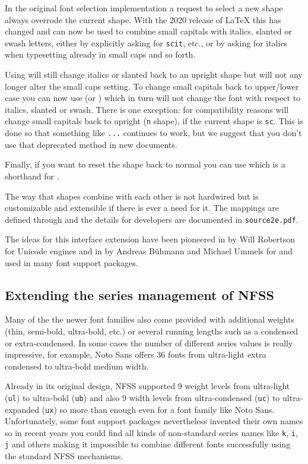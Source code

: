 \documentclass{ltnews}
\providecommand\pdfTeX{\hologo{pdfTeX}}
\begin{document}
In the original font selection implementation a request to select a new shape
always overrode the current shape. With the 2020 release of \LaTeX{}
this has changed and  can now be used to combine small
capitals with italics, slanted or swash letters, either by explicitly
asking for \texttt{scit}, etc., or by asking for italics when typesetting
already in small caps and so forth.

Using  will still change italics or slanted back to an
upright shape but will not any longer alter the small caps setting. To
change small capitals back to upper/lower case you can now use
 (or ) which in turn will not change the font
with respect to italics, slanted or swash.
%
There is one exception: for compatibility reasons  will
change small capitals back to upright (\texttt{n} shape), if the
current shape is \texttt{sc}. This is done so that something like
\allowbreak\texttt{...}\allowbreak{} continues
to work, but we suggest that you don't use that deprecated method in
new documents.

Finally, if you want to
reset the shape back to normal you can use  which is a
shorthand for .

The way that shapes combine with each other is not hardwired but is
customizable and extensible if there is ever a need for it. The
mappings are defined through  and the
details for developers are documented in \texttt{source2e.pdf}.

The ideas for this interface extension have been pioneered in
 by Will Robertson for Unicode engines and in
 by Andreas Bühmann and Michael Ummels for \pdfTeX{} and
used in many font support packages.



\subsection{Extending the series management of NFSS}

Many of the the newer font families also come provided with additional
weights (thin, semi-bold, ultra-bold, etc.\@) or several running lengths
such as a condensed or extra-condensed. In some cases the number of
different series values is really impressive, for example, Noto Sans
offers 36 fonts from ultra-light extra condensed to ultra-bold medium width.

Already in its original design, NFSS supported 9 weight levels from
ultra-light (\texttt{ul}) to ultra-bold (\texttt{ub}) and also 9 width
levels from ultra-condensed (\texttt{uc}) to ultra-expanded
(\texttt{ux}) so more than enough even for a font family like Noto
Sans. Unfortunately, some font support packages nevertheless invented
their own names so in recent years you could find all kinds of
non-standard series names like \texttt{k}, \texttt{i}, \texttt{j} and
others making it impossible to combine different fonts successfully
using the standard NFSS mechanisms.
\end{document}
